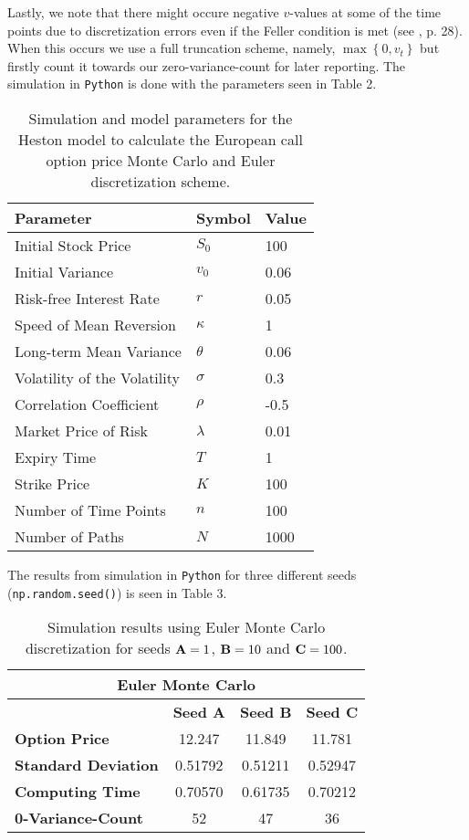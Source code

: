 \documentclass[12pt]{article}
\numberwithin{equation}{section}
\newcommand{\lc}{\left\{}
\newcommand{\rc}{\right\}}
\begin{document}
Lastly, we note that there might occure negative $v$-values at some of the time
points due to discretization errors even if the Feller condition is met (see
\cite{Havrylenko2024}, p. 28). When this occurs we use a full truncation
scheme, namely, $\max\lc 0,v_t\rc$ but firstly count it towards
our zero-variance-count for later reporting.
\newpage
The simulation in \texttt{Python} is done with the parameters seen in Table 2.
\begin{table}[!h]
    \centering
    \begin{tabular}{lll}
    \toprule
    \textbf{Parameter} & \textbf{Symbol} & \textbf{Value} \\
    \midrule
    Initial Stock Price & $S_0$ & 100 \\
    Initial Variance & $v_0$ & 0.06 \\
    Risk-free Interest Rate & $r$ & 0.05 \\
    Speed of Mean Reversion & $\kappa$ & 1 \\
    Long-term Mean Variance & $\theta$ & 0.06 \\
    Volatility of the Volatility & $\sigma$ & 0.3 \\
    Correlation Coefficient & $\rho$ & -0.5 \\
    Market Price of Risk & $\lambda$ & 0.01 \\
    Expiry Time & $T$ & 1 \\
    Strike Price & $K$ & 100 \\
    Number of Time Points & $n$ & 100 \\
    Number of Paths & $N$ & 1000 \\
    \bottomrule
    \end{tabular}
    \caption{Simulation and model parameters for the Heston model to calculate the European call option price Monte Carlo and Euler discretization scheme.}
    \label{table:call_option_pricing_parameters1}
    \end{table}

The results from simulation in \texttt{Python} for three different seeds
(\texttt{np.random.seed()}) is seen in Table 3.

\begin{table}[ht]
    \centering
    \begin{tabular}{|l|c|c|c|}
    \hline
    \multicolumn{4}{|c|}{\textbf{Euler Monte Carlo}} \\ \hline
    \textbf{}  & \textbf{Seed A} & \textbf{Seed B} & \textbf{Seed C} \\ \hline
    \textbf{Option Price} & 12.247 & 11.849 & 11.781 \\
    \textbf{Standard Deviation} & 0.51792 & 0.51211 & 0.52947 \\
    \textbf{Computing Time} & 0.70570 & 0.61735 & 0.70212 \\
    \textbf{0-Variance-Count} & 52 & 47 & 36 \\ \hline
    \end{tabular}
    \caption{Simulation results using Euler Monte Carlo discretization for seeds $\text{\textbf{A}}=1$, $\text{\textbf{B}}=10$ and $\text{\textbf{C}}=100$.}
    \label{table:simulation_results1}
\end{table}
\end{document}
